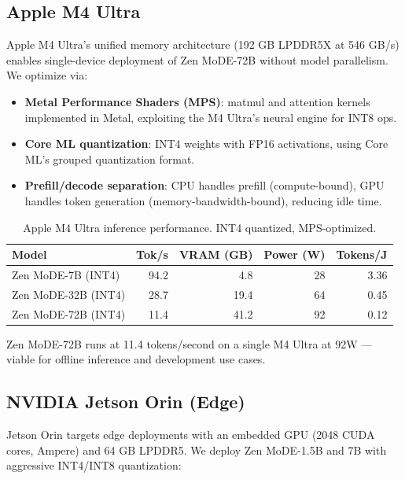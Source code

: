 \documentclass[11pt,a4paper]{article}
\begin{document}
\subsection{Apple M4 Ultra}

Apple M4 Ultra's unified memory architecture (192 GB LPDDR5X at 546 GB/s) enables
single-device deployment of Zen MoDE-72B without model parallelism. We optimize via:

\begin{itemize}
    \item \textbf{Metal Performance Shaders (MPS)}: matmul and attention kernels
          implemented in Metal, exploiting the M4 Ultra's neural engine for INT8 ops.
    \item \textbf{Core ML quantization}: INT4 weights with FP16 activations, using
          Core ML's grouped quantization format.
    \item \textbf{Prefill/decode separation}: CPU handles prefill (compute-bound),
          GPU handles token generation (memory-bandwidth-bound), reducing idle time.
\end{itemize}

\begin{table}[H]
\centering
\caption{Apple M4 Ultra inference performance. INT4 quantized, MPS-optimized.}
\begin{tabular}{lrrrr}
\toprule
\textbf{Model} & \textbf{Tok/s} & \textbf{VRAM (GB)} & \textbf{Power (W)} & \textbf{Tokens/J} \\
\midrule
Zen MoDE-7B  (INT4) & 94.2  & 4.8  & 28  & 3.36 \\
Zen MoDE-32B (INT4) & 28.7  & 19.4 & 64  & 0.45 \\
Zen MoDE-72B (INT4) & 11.4  & 41.2 & 92  & 0.12 \\
\bottomrule
\end{tabular}
\label{tab:m4}
\end{table}

Zen MoDE-72B runs at 11.4 tokens/second on a single M4 Ultra at 92W — viable for
offline inference and development use cases.

\subsection{NVIDIA Jetson Orin (Edge)}

Jetson Orin targets edge deployments with an embedded GPU (2048 CUDA cores, Ampere)
and 64 GB LPDDR5. We deploy Zen MoDE-1.5B and 7B with aggressive INT4/INT8 quantization:
\end{document}
